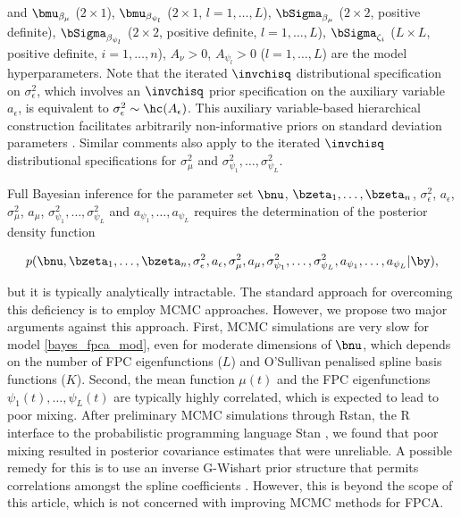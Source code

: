 \documentclass[12pt]{article}
\def\sigsqeps{\sigma^2_{\epsilon}}
\def\aeps{a_{\epsilon}}
\def\sigsqmu{\sigma^2_{\mu}}
\def\amu{a_{\mu}}
\newcommand\sigsqpsi[1]{\sigma^2_{\psi_{#1}}}
\newcommand\apsi[1]{a_{\psi_{#1}}}
\theoremstyle{plain}
\theoremstyle{definition}
\theoremstyle{remark}
\begin{document}
\noindent and $\bmu_{\beta_\mu}$ ($2 \times 1$), $\bmu_{\beta_{\psi_l}}$ ($2 \times 1$, $l = 1, \dots, L$),
$\bSigma_{\beta_\mu}$ ($2 \times 2$, positive definite), $\bSigma_{\beta_{\psi_l}}$ ($2 \times 2$, positive definite,
$l = 1, \dots, L$), $\bSigma_{\zeta_i}$ ($L \times L$, positive definite, $i = 1, \dots, n$), $A_\nu > 0$,
$A_{\psi_l} > 0$ ($l = 1, \dots, L$) are the model hyperparameters.
Note that the iterated $\invchisq$ distributional specification on $\sigsqeps$,
which involves an $\invchisq$ prior specification on the auxiliary variable $\aeps$, is equivalent to $\sigsqeps \sim
\hc (A_{\epsilon})$. This auxiliary variable-based hierarchical construction facilitates arbitrarily non-informative
priors on standard deviation parameters \cite{gelman06}. Similar comments also apply to the iterated $\invchisq$
distributional specifications for $\sigsqmu$ and $\sigsqpsi{1}, \dots, \sigsqpsi{L}$.

Full Bayesian inference for the parameter set $\bnu$, $\bzeta_1, \dots, \bzeta_n$, $\sigsqeps$, $\aeps$,
$\sigsqmu$, $\amu$, $\sigsqpsi{1}, \dots, \sigsqpsi{L}$ and $\apsi{1}, \dots, \apsi{L}$ requires the determination
of the posterior density function

\[
	p (
		\bnu, \bzeta_1, \dots, \bzeta_n, \sigsqeps, \aeps, \sigsqmu, \amu,
		\sigsqpsi{1}, \dots, \sigsqpsi{L}, \apsi{1}, \dots, \apsi{L} | \by
	),
\]

\noindent but it is typically analytically intractable. The standard approach for overcoming this deficiency is to
employ MCMC approaches. However, we propose two major arguments against this approach. First, MCMC
simulations are very slow for model \eqref{bayes_fpca_mod}, even for moderate dimensions of $\bnu$, which
depends on the number of FPC eigenfunctions ($L$) and O'Sullivan penalised spline basis functions ($K$).
Second, the mean function $\mu (t)$ and the FPC eigenfunctions $\psi_1 (t), \dots,
\psi_L (t)$ are typically highly correlated, which is expected to lead to poor mixing. After preliminary MCMC
simulations through \textsf{Rstan}, the \textsf{R} \cite{r20} interface to the probabilistic programming language
\textsf{Stan} \cite{rstan20}, we found that poor mixing resulted in posterior covariance estimates
that were unreliable. A possible remedy for this is to use an inverse G-Wishart prior structure that permits
correlations amongst the spline coefficients \cite{goldsmith16}. However, this is beyond the scope of this article,
which is not concerned with improving MCMC methods for FPCA.
\end{document}
